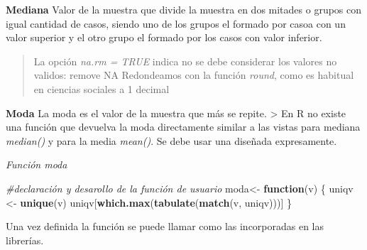 \documentclass[
]{article}
\newenvironment{Shaded}{\begin{snugshade}}{\end{snugshade}}
\newcommand{\AttributeTok}[1]{\textcolor[rgb]{0.13,0.29,0.53}{#1}}
\newcommand{\CommentTok}[1]{\textcolor[rgb]{0.56,0.35,0.01}{\textit{#1}}}
\newcommand{\ConstantTok}[1]{\textcolor[rgb]{0.56,0.35,0.01}{#1}}
\newcommand{\ControlFlowTok}[1]{\textcolor[rgb]{0.13,0.29,0.53}{\textbf{#1}}}
\newcommand{\DecValTok}[1]{\textcolor[rgb]{0.00,0.00,0.81}{#1}}
\newcommand{\FunctionTok}[1]{\textcolor[rgb]{0.13,0.29,0.53}{\textbf{#1}}}
\newcommand{\NormalTok}[1]{#1}
\newcommand{\OtherTok}[1]{\textcolor[rgb]{0.56,0.35,0.01}{#1}}
\newcommand{\SpecialCharTok}[1]{\textcolor[rgb]{0.81,0.36,0.00}{\textbf{#1}}}
\begin{document}
\textbf{Mediana} Valor de la muestra que divide la muestra en dos
mitades o grupos con igual cantidad de casos, siendo uno de los grupos
el formado por casoa con un valor superior y el otro grupo el formado
por los casos con valor inferior.

\begin{Shaded}
\end{Shaded}

\begin{quote}
La opción \emph{na.rm = TRUE} indica no se debe considerar los valores
no validos: remove NA Redondeamos con la función \emph{round}, como es
habitual en ciencias sociales a 1 decimal
\end{quote}

\textbf{Moda} La moda es el valor de la muestra que más se repite.
\textgreater{} En R no existe una función que devuelva la moda
directamente similar a las vistas para mediana \emph{median()} y para la
media \emph{mean()}. Se debe usar una diseñada expresamente.

\emph{Función moda}

\begin{Shaded}
\begin{Highlighting}[]
\CommentTok{\#declaración y desarollo de la función de usuario}
\NormalTok{moda}\OtherTok{\textless{}{-}} \ControlFlowTok{function}\NormalTok{(v) \{}
\NormalTok{uniqv }\OtherTok{\textless{}{-}} \FunctionTok{unique}\NormalTok{(v)}
\NormalTok{uniqv[}\FunctionTok{which.max}\NormalTok{(}\FunctionTok{tabulate}\NormalTok{(}\FunctionTok{match}\NormalTok{(v, uniqv)))]}
\NormalTok{\}}
\end{Highlighting}
\end{Shaded}

Una vez definida la función se puede llamar como las incorporadas en las
librerías.

\begin{Shaded}
\end{Shaded}
\end{document}
